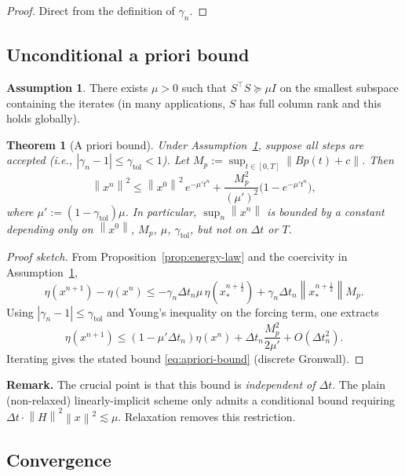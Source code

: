 \documentclass[11pt]{article}
\newtheorem{theorem}{Theorem}
\theoremstyle{definition}
\newtheorem{assumption}{Assumption}
\newcommand{\norm}[1]{\left\|#1\right\|}
\newcommand{\dt}{\Delta t}
\newcommand{\half}{\tfrac{1}{2}}
\begin{document}
\begin{proof}
Direct from the definition of $\gamma_n$.
\end{proof}

\subsection{Unconditional a priori bound}

\begin{assumption}
\label{ass:coercive}
There exists $\mu > 0$ such that $S^\top S \succeq \mu I$ on the smallest subspace containing the iterates (in many applications, $S$ has full column rank and this holds globally).
\end{assumption}

\begin{theorem}[A priori bound]
\label{thm:apriori}
Under Assumption~\ref{ass:coercive}, suppose all steps are accepted (i.e., $|\gamma_n - 1| \le \gamma_{\text{tol}} < 1$). Let $M_p := \sup_{t \in [0,T]} \norm{B p(t) + c}$. Then
\begin{equation}
\label{eq:apriori-bound}
\norm{x^n}^2 \le \norm{x^0}^2 \, e^{-\mu' t^n} + \frac{M_p^2}{(\mu')^2}\bigl(1 - e^{-\mu' t^n}\bigr),
\end{equation}
where $\mu' := (1 - \gamma_{\text{tol}}) \mu$. In particular, $\sup_n \norm{x^n}$ is bounded by a constant depending only on $\norm{x^0}$, $M_p$, $\mu$, $\gamma_{\text{tol}}$, but \emph{not on $\dt$ or $T$}.
\end{theorem}

\begin{proof}[Proof sketch]
From Proposition~\ref{prop:energy-law} and the coercivity in Assumption~\ref{ass:coercive},
\[
\eta(x^{n+1}) - \eta(x^n) \le -\gamma_n \dt_n \mu \, \eta(x^{n+\half}_*) + \gamma_n \dt_n \norm{x^{n+\half}_*} M_p.
\]
Using $|\gamma_n - 1| \le \gamma_{\text{tol}}$ and Young's inequality on the forcing term, one extracts
\[
\eta(x^{n+1}) \le (1 - \mu' \dt_n) \eta(x^n) + \dt_n \frac{M_p^2}{2 \mu'} + O(\dt_n^2).
\]
Iterating gives the stated bound \eqref{eq:apriori-bound} (discrete Gronwall).
\end{proof}

\textbf{Remark.} The crucial point is that this bound is \emph{independent of $\dt$}. The plain (non-relaxed) linearly-implicit scheme only admits a conditional bound requiring $\dt \cdot \norm{H}^2 \norm{x}^2 \lesssim \mu$. Relaxation removes this restriction.

\subsection{Convergence}
\end{document}
